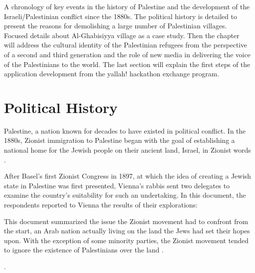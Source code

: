 A chronology of key events in the history of Palestine and the development of the Israeli/Palestinian conflict since the 1880s. The political history is detailed to present the reasons for demolishing a large number of Palestinian villages. Focused details about Al-Ghabisiyya village as a case study. Then the chapter will address the cultural identity of the Palestinian refugees from the perspective of a second and third generation and the role of new media in delivering the voice of the Palestinians to the world. The last section will explain the first steps of the application development from the \acrshort{yallah!} hackathon exchange program.  
\section{Political History}

Palestine, a nation known for decades to have existed in political conflict. In the 1880s, Zionist immigration to Palestine began with the goal of establishing a national home for the Jewish people on their ancient land, Israel, in Zionist words \citep{Morris2004, Pappe2006, Khalidi2015}.

After Basel's first Zionist Congress in 1897, at which the idea of creating a Jewish state in Palestine was first presented, Vienna's rabbis sent two delegates to examine the country's suitability for such an undertaking. 
In this document, the respondents reported to Vienna the results of their explorations:





\centerline{\textit{}}


This document summarized the issue the Zionist movement had to confront from the start, an Arab nation actually living on the land the Jews had set their hopes upon. With the exception of some minority parties, the Zionist movement tended to ignore the existence of Palestinians over the land \citep{Shlaim2014, Karmi2007}.

 \cite[p.11]{Pappe2006}.


